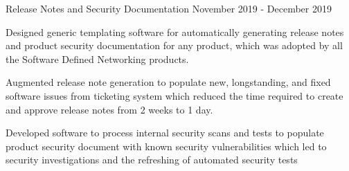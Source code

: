 \begin{cventries}
  \cventry
    {} {Release Notes and Security Documentation} {} {November 2019 - December 2019} {
      \begin{cvitems}
        \item {Designed generic templating software for automatically generating release notes and product security documentation for any product, which was adopted by all the Software Defined Networking products.}
        \item {Augmented release note generation to populate new, longstanding, and fixed software issues from ticketing system which reduced the time required to create and approve release notes from 2 weeks to 1 day.}
        \item {Developed software to process internal security scans and tests to populate product security document with known security vulnerabilities which led to security investigations and the refreshing of automated security tests}
      \end{cvitems}
    }


\end{cventries}
